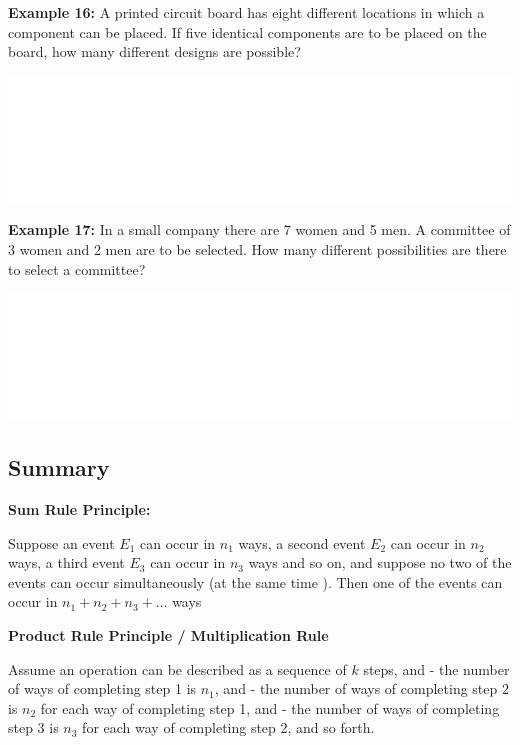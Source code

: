 \documentclass[]{book}
\begin{document}
\textbf{Example 16:} A printed circuit board has eight different locations in which a component can be placed. If five identical components are to be placed on the board, how many different designs are possible?

\begin{center}\includegraphics[width=1\linewidth]{figure/box892-1} \end{center}

\textbf{Example 17:} In a small company there are 7 women and 5 men. A committee of 3 women and 2 men are to be selected. How many different possibilities are there to select a committee?

\begin{center}\includegraphics[width=1\linewidth]{figure/box893-1} \end{center}

\newpage

\hypertarget{summary}{%
\subsection*{Summary}\label{summary}}

\textbf{Sum Rule Principle:}

Suppose an event \(E_1\) can occur in \(n_1\) ways, a second event \(E_2\) can occur in \(n_2\) ways, a third event \(E_3\) can occur in \(n_3\) ways and so on, and suppose no two of the events can occur simultaneously (at the same time ).
Then one of the events can occur in \(n_1 + n_2 + n_3 + \dots\) ways

\textbf{Product Rule Principle / Multiplication Rule}

Assume an operation can be described as a sequence of \(k\) steps, and
- the number of ways of completing step 1 is \(n_1\), and
- the number of ways of completing step 2 is \(n_2\) for each way of completing step 1, and
- the number of ways of completing step 3 is \(n_3\) for each way of completing step 2, and so forth.
\end{document}
